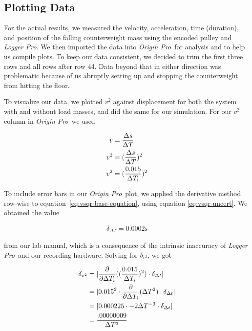 \documentclass[coverpage]{article}
\newcommand{\softwareText}[1]{\textit{#1}\texttrademark}
\newcommand{\loggerpro}{\softwareText{Logger Pro}}
\newcommand{\origin}{\softwareText{Origin Pro}}
\begin{document}
	\subsection{Plotting Data}
	
	For the actual results, we measured the velocity,  acceleration, time (duration), and position of the falling counterweight mass using the encoded pulley and \loggerpro. We then imported the data into \origin~for analysis and to help us compile plots. To keep our data consistent, we decided to trim the first three rows and all rows after row 44. Data beyond that in either direction was problematic because of us abruptly setting up and stopping the counterweight from hitting the floor.
	
	To visualize our data, we plotted $v^2$ against displacement for both the system with and without load masses, and did the same for our simulation. For our $v^2$ column in \origin~we used
	
	\begin{align}
		v&=\frac{\Delta{s}}{\Delta{T}} \notag \\
		v^2&=(\frac{\Delta{s}}{\Delta{T}})^2 \notag \\
		v^2&=(\frac{0.015}{\Delta{T}_i})^2 \label{eq:vsqr-base-equation}
	\end{align}

	To include error bars in our \origin~plot, we applied the derivative method row-wise to equation~\ref{eq:vsqr-base-equation}, using equation \ref{eq:vsqr-uncert}. We obtained the value
	
	\begin{align}
		\delta_{\Delta{T}} = 0.0002 \text{s}
	\end{align}

	from our lab manual, which is a consequence of the intrinsic inaccuracy of \loggerpro~and our recording hardware. Solving for $\delta_{v^2}$, we got
	 
	\begin{align}
		\delta_{v^2}&=|\frac{\partial}{\partial \Delta{T_i}} ((\frac{0.015}{\Delta{T}_i})^2) \cdot \delta_{\Delta{t}}| \notag \\
		&=|0.015^2 \cdot \frac{\partial}{\partial \Delta{T_i}} (\Delta{T}^2) \cdot \delta_{\Delta{t}}| \notag \\
		&=|0.000225 \cdot -2 \Delta{T}^{-3} \cdot \delta_{\Delta{t}}| \notag \\
		&=\frac{.00000009}{\Delta{T}^3}
		\label{eq:vsqr-uncert}
	\end{align}
	
\end{document}
